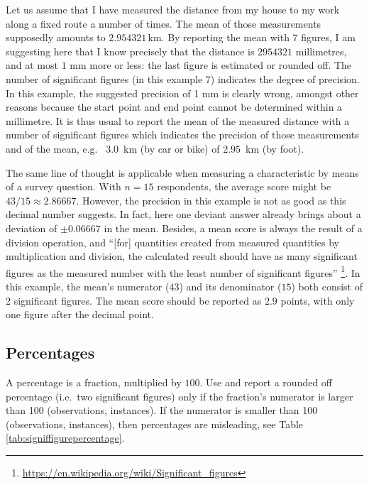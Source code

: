 \documentclass[
]{book}
\begin{document}
Let us assume that I have measured the distance from my house to my work
along a fixed route a number of times. The mean of those measurements
supposedly amounts to \(2.954321\) km. By reporting the mean with 7 figures,
I am suggesting here that I know precisely that the distance is \(2954321\) millimetres,
and at most \(1\) mm more or less:
the last figure is estimated or rounded off. The number of significant figures
(in this example 7) indicates the degree of precision. In this example, the
suggested precision of 1 mm is clearly
wrong, amongst other reasons because the start point and end point cannot be determined
within a millimetre. It is thus usual to report the mean of the measured
distance with a number of significant figures which indicates the precision
of those measurements and of the mean, e.g.~
\(3.0\)~km (by car or bike) of \(2.95\)~km (by foot).

The same line of thought is applicable when measuring a characteristic
by means of a survey question. With \(n=15\) respondents, the average score
might be \(43/15 \approx 2.86667\). However, the precision
in this example is not as good as this decimal number suggests. In fact,
here one deviant answer already brings about a deviation of
\(\pm0.06667\) in the mean. Besides, a mean score
is always the result of a division operation, and
``{[}for{]} quantities created from measured quantities by multiplication and division, the calculated result should have as many significant figures as the measured number with the least number of significant figures'' \footnote{\url{https://en.wikipedia.org/wiki/Significant_figures}}.
In this example, the mean's numerator (\(43\)) and its denominator (\(15\)) both consist
of 2 significant figures. The mean score should be reported as \(2.9\) points, with only
one figure after the decimal point.

\subsection{Percentages}\label{percentages}

A percentage is a fraction, multiplied by \(100\).
Use and report a rounded off percentage (i.e.~two significant
figures) only if the fraction's numerator is larger
than 100 (observations, instances). If the numerator is smaller than 100
(observations, instances), then percentages are misleading,
see Table \ref{tab:signiffigurepercentage}.
\end{document}
